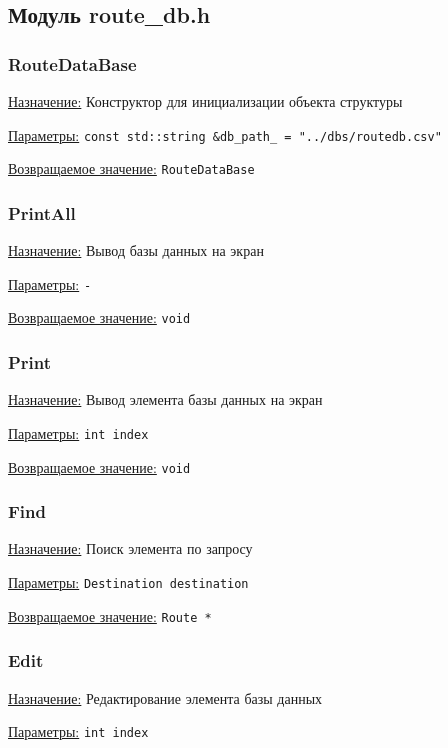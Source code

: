 \subsection{Модуль route\_db.h}


\subsubsection{RouteDataBase}

\underline{Назначение:} 
Конструктор для инициализации объекта структуры

\underline{Параметры:} \verb|const std::string &db_path_ = "../dbs/routedb.csv"|

\underline{Возвращаемое значение:} \verb|RouteDataBase|


\subsubsection{PrintAll}

\underline{Назначение:}
Вывод базы данных на экран

\underline{Параметры:} \verb|-|

\underline{Возвращаемое значение:} \verb|void|


\subsubsection{Print}

\underline{Назначение:}
Вывод элемента базы данных на экран

\underline{Параметры:} \verb|int index|

\underline{Возвращаемое значение:} \verb|void|


\subsubsection{Find}

\underline{Назначение:}
Поиск элемента по запросу

\underline{Параметры:} \verb|Destination destination|

\underline{Возвращаемое значение:} \verb|Route *|


\subsubsection{Edit}

\underline{Назначение:}
Редактирование элемента базы данных

\underline{Параметры:} \verb|int index|


